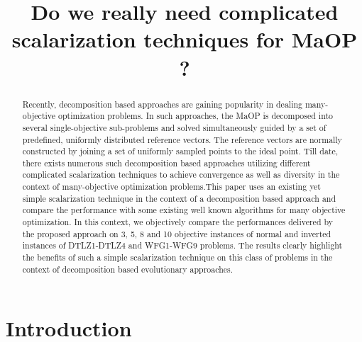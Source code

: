 \documentclass{sig-alternate}
\begin{document}
 
\title{Do we really need complicated scalarization techniques for MaOP ?}

\maketitle
\begin{abstract} 
Recently, decomposition based approaches are gaining popularity in dealing many-objective optimization problems. In such approaches, the MaOP is decomposed into several single-objective sub-problems and solved simultaneously guided by a set of predefined, uniformly distributed reference vectors. The reference vectors are normally constructed by joining a set of uniformly sampled points to the ideal point. Till date, there exists numerous such decomposition based approaches utilizing different complicated scalarization techniques to achieve convergence as well as diversity in the context of many-objective optimization problems.This paper uses an existing yet simple scalarization technique in the context of a decomposition based approach and compare the performance with some existing well known algorithms for many objective optimization. In this context, we objectively compare the performances delivered by the proposed approach on 3, 5, 8 and 10 objective instances of normal and inverted instances of DTLZ1-DTLZ4 and WFG1-WFG9 problems. The results clearly highlight the benefits of such a simple scalarization technique on this class of problems in the context of decomposition based evolutionary approaches.\\ 
\end{abstract}



\section{Introduction} 
\end{document}
